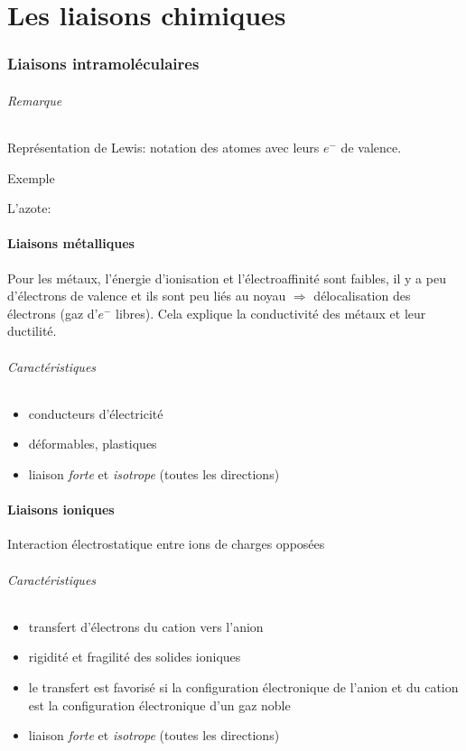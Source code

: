 \documentclass[11pt,a4paper,french]{article}
\begin{document}
\part{Les liaisons chimiques}
\section{Liaisons intramoléculaires}
\paragraph{Remarque} Représentation de Lewis: notation des atomes avec leurs $e^-$ de valence.

\subparagraph{Exemple} L'azote:\hspace{0.7cm} 

\subsection{Liaisons métalliques}
Pour les métaux, l'énergie d'ionisation et l'électroaffinité sont faibles, il y a peu d'électrons de valence et ils sont peu liés au noyau $\Rightarrow$ délocalisation des électrons (gaz d'$e^-$ libres).
Cela explique la conductivité des métaux et leur ductilité.
\paragraph{Caractéristiques}
\begin{itemize}
	\item conducteurs d'électricité
	\item déformables, plastiques
	\item liaison \emph{forte} et \emph{isotrope} (toutes les directions)
\end{itemize}

\subsection{Liaisons ioniques}
Interaction électrostatique entre ions de charges opposées
\paragraph{Caractéristiques}
\begin{itemize}
	\item transfert d'électrons du cation vers l'anion
	\item rigidité et fragilité des solides ioniques
	\item le transfert est favorisé si la configuration électronique de l'anion et du cation est la configuration électronique d'un gaz noble
	\item liaison \emph{forte} et \emph{isotrope} (toutes les directions)
\end{itemize}
\end{document}
